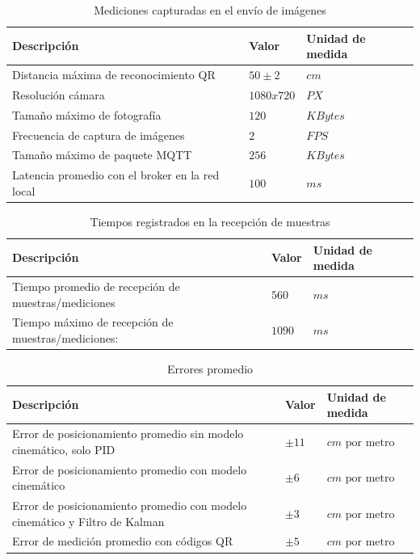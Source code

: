 \begin{table}[H]
\centering
\begin{tabular}{|l|l|l|}
	\hline \rowcolor{test_header_color}
        Descripción & Valor & Unidad de medida \\
        \hline
            Distancia máxima de reconocimiento QR & $50 \pm 2$ & $cm$ \\
        \hline
            Resolución cámara & $1080x720$ & $PX$ \\
        \hline
            Tamaño máximo de fotografía & $120$ & $KBytes$ \\
        \hline
            Frecuencia de captura de imágenes & $2$ & $FPS$ \\
        \hline
            Tamaño máximo de paquete MQTT & $256$ & $KBytes$ \\
        \hline
            Latencia promedio con el broker en la red local & $100$ & $ms$ \\
        \hline
    \end{tabular}
\caption{Mediciones capturadas en el envío de imágenes}
\end{table}

\begin{table}[H]
\centering
\begin{tabular}{|l|l|l|}
	\hline \rowcolor{test_header_color}
        Descripción & Valor & Unidad de medida \\
        \hline
            Tiempo promedio de recepción de muestras/mediciones & $560$ & $ms$ \\
        \hline
            Tiempo máximo de recepción de muestras/mediciones: & $1090$ & $ms$ \\
        \hline
    \end{tabular}
    \caption{Tiempos registrados en la recepción de muestras}
\end{table}

\begin{table}[H]
\centering
\begin{tabular}{|l|l|l|}
	\hline \rowcolor{test_header_color}
        Descripción & Valor & Unidad de medida \\
    \hline
        Error de posicionamiento promedio sin modelo cinemático, solo PID           & $\pm11$   & $cm\text{ por metro}$ \\
    \hline
        Error de posicionamiento promedio con modelo cinemático                     & $\pm6$    & $cm\text{ por metro}$ \\
    \hline
        Error de posicionamiento promedio con modelo cinemático y Filtro de Kalman  & $\pm3$    & $cm\text{ por metro}$ \\
    \hline
        Error de medición promedio con códigos QR                                   & $\pm5$    & $cm\text{ por metro}$ \\
    \hline
\end{tabular}
\caption{Errores promedio}
\end{table}

